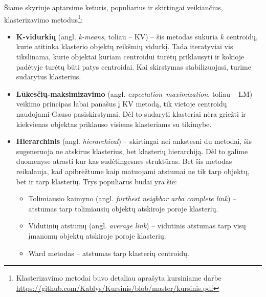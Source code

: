 \documentclass{VUMIFInfBakalaurinis}
\begin{document}
Šiame skyriuje aptarsime keturis, populiarius \cite{wu2008top} ir skirtingai veikiančius, klasterizavimo
metodus\footnote{Klasterizavimo metodai buvo detaliau
  aprašyta kursiniame darbe \url{https://github.com/Kablys/Kursinis/blob/master/kursinis.pdf}}:

\begin{itemize}
\item
  \textbf{K-vidurkių} (angl. \emph{k-means}, toliau -- KV) -- šis
  metodas sukuria $k$ centroidų, kurie atitinka klasterio objektų
  reikšmių vidurkį. Tada iteratyviai vis tikslinama, kurie objektai
  kuriam centroidui turėtų priklausyti ir kokioje padėtyje turėtų būti
  patys centroidai. Kai skirstymas stabilizuojasi, turime sudarytus
  klasterius.
\item
  \textbf{Lūkesčių-maksimizavimo} (angl.
  \emph{expectation--maximization}, toliau -- LM) -- veikimo principas
  labai panašus į KV metodą, tik vietoje centroidų naudojami Gauso
  pasiskirstymai. Dėl to sudaryti klasteriai nėra griežti ir kiekvienas
  objektas priklauso visiems klasteriams su tikimybe.
\item
  \textbf{Hierarchinis} (angl. \emph{hierarchical}) -- skirtingai nei
  ankstesni du metodai, šis sugeneruoja ne atskirus klasterius, bet
  klasterių hierarchiją. Dėl to galime duomenyse atrasti kur kas
  sudėtingesnes struktūras. Bet šis metodas reikalauja, kad apibrėžtume
  kaip matuojami atstumai ne tik tarp objektų, bet ir tarp klasterių.
  Trys populiarūs būdai yra šie:

  \begin{itemize}
  \item
    Tolimiausio kaimyno (angl. \emph{furthest neighbor arba complete
    link}) -- atstumas tarp tolimiausių objektų atskiroje poroje
    klasterių.
  \item
    Vidutinių atstumų (angl. \emph{average link}) -- vidutinis atstumas
    tarp visų įmanomų objektų atskiroje poroje klasterių.
  \item
    Ward metodas -- atstumas tarp klasterių centroidų.
  \end{itemize}
  

\end{itemize}
\end{document}
